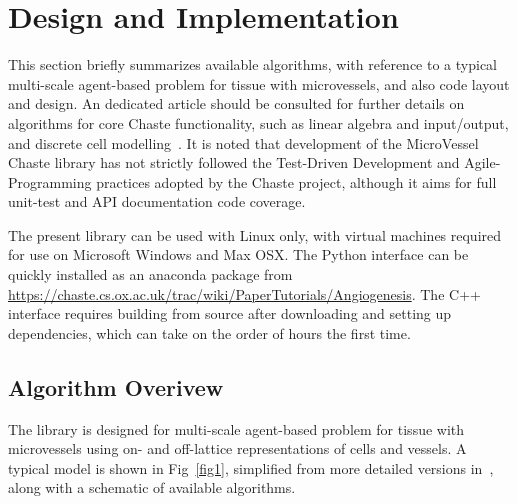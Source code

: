 \documentclass[10pt,letterpaper]{article}
\begin{document}
\section*{Design and Implementation}

This section briefly summarizes available algorithms, with reference to a typical multi-scale agent-based problem for tissue with microvessels, and also code layout and design. An dedicated article should be consulted for further details on algorithms for core Chaste functionality, such as linear algebra and input/output, and discrete cell modelling~\cite{Mirams2013}. It is noted that development of the MicroVessel Chaste library has not strictly followed the Test-Driven Development and Agile-Programming practices adopted by the Chaste project, although it aims for full unit-test and API documentation code coverage.

The present library can be used with Linux only, with virtual machines required for use on Microsoft Windows and Max OSX. The Python interface can be quickly installed as an anaconda package from \url{https://chaste.cs.ox.ac.uk/trac/wiki/PaperTutorials/Angiogenesis}. The C++ interface requires building from source after downloading and setting up dependencies, which can take on the order of hours the first time.

\subsection*{Algorithm Overivew}

The library is designed for multi-scale agent-based problem for tissue with microvessels using on- and off-lattice representations of cells and vessels. A typical model is shown in Fig~\ref{fig1}, simplified from more detailed versions in~\cite{Owen2011}, along with a schematic of available algorithms. 
\end{document}

